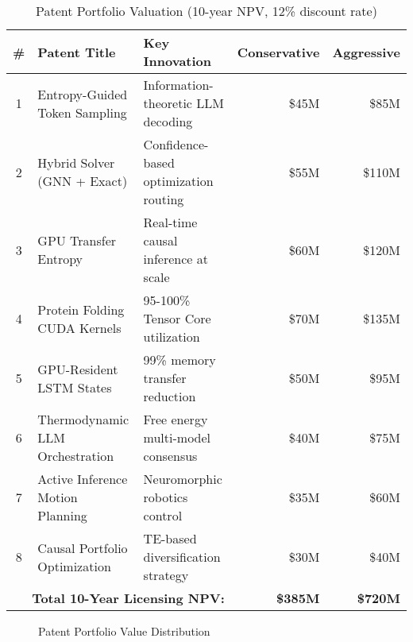 \documentclass[11pt,letterpaper]{article}
\begin{document}
\begin{table}[H]
\centering
\small
\begin{tabularx}{\textwidth}{clXrr}
\toprule
\textbf{\#} & \textbf{Patent Title} & \textbf{Key Innovation} & \textbf{Conservative} & \textbf{Aggressive} \\
\midrule
1 & Entropy-Guided Token Sampling & Information-theoretic LLM decoding & \$45M & \$85M \\
2 & Hybrid Solver (GNN + Exact) & Confidence-based optimization routing & \$55M & \$110M \\
3 & GPU Transfer Entropy & Real-time causal inference at scale & \$60M & \$120M \\
4 & Protein Folding CUDA Kernels & 95-100\% Tensor Core utilization & \$70M & \$135M \\
5 & GPU-Resident LSTM States & 99\% memory transfer reduction & \$50M & \$95M \\
6 & Thermodynamic LLM Orchestration & Free energy multi-model consensus & \$40M & \$75M \\
7 & Active Inference Motion Planning & Neuromorphic robotics control & \$35M & \$60M \\
8 & Causal Portfolio Optimization & TE-based diversification strategy & \$30M & \$40M \\
\midrule
\multicolumn{3}{r}{\textbf{Total 10-Year Licensing NPV:}} & \textbf{\$385M} & \textbf{\$720M} \\
\bottomrule
\end{tabularx}
\caption{Patent Portfolio Valuation (10-year NPV, 12\% discount rate)}
\end{table}

\begin{figure}[H]
\centering
{}
\caption{Patent Portfolio Value Distribution}
\end{figure}
\end{document}
